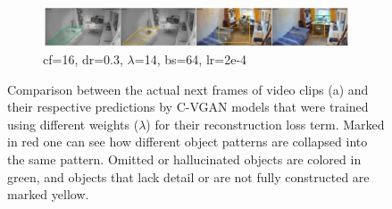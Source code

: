 \begin{figure}
	\begin{subfigure}{\textwidth}
		\centering
		\includegraphics[width=\textwidth]{graphics/eval/cvgan_2/qual_basic/dfilter-16_ddropout-0.3_lambda-14_batchsize-64_learningrate-0.0002/predicted.pdf}
	  \caption{cf=16, dr=0.3, $\lambda$=14, bs=64, lr=2e-4}
	  \label{subfig:l14-comp-1}
	\end{subfigure}
	
	\caption[Qualitative comparison between different C-VGAN models. (1)]{Comparison between the actual next frames of video clips (a) and their respective predictions by C-VGAN models that were trained using different weights ($\lambda$) for their reconstruction loss term. Marked in red one can see how different object patterns are collapsed into the same pattern. Omitted or hallucinated objects are colored in green, and objects that lack detail or are not fully constructed are marked yellow.}
	\label{fig:cvgan_comparison_lambda}
\end{figure}

